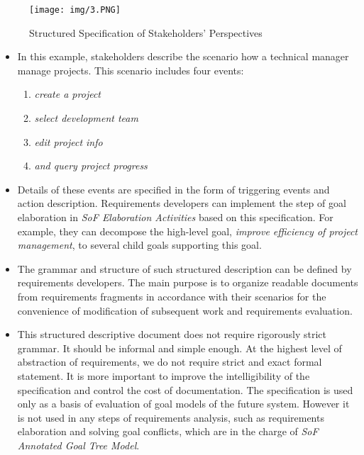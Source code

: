 ﻿\documentclass{beamer}
\begin{document}
\begin{frame}          %
  \begin{figure}
    \texttt{[image: img/3.PNG]}
    \caption{Structured Specification of Stakeholders' Perspectives}
  \end{figure}
\end{frame}

\begin{frame}     %
  \footnotesize{
    \begin{itemize}
    \item
      In this example, stakeholders describe the scenario how a technical manager manage projects.
      This scenario includes four events:
      \begin{enumerate}
      \item \emph{create a project}
      \item \emph{select development team}
      \item \emph{edit project info}
      \item \emph{and query project progress}
      \end{enumerate}
    \item 
      Details of these events are specified in the form of triggering events and action description.
      Requirements developers can implement the step of goal elaboration in \emph{SoF Elaboration Activities} based on this specification.
      For example, they can decompose the high-level goal, \emph{improve efficiency of project management}, to several child goals supporting this goal.\pause
    \end{itemize}
  }
\end{frame}
\begin{frame}     %
  \footnotesize{
    \begin{itemize}
    \item 
      The grammar and structure of such structured description can be defined by requirements developers. The main purpose is to organize readable documents from requirements fragments in accordance with their scenarios for the convenience of modification of subsequent work and requirements evaluation.\pause
    \item
      This structured descriptive document does not require rigorously strict grammar.
      It should be informal and simple enough.
      At the highest level of abstraction of requirements, we do not require strict and exact formal statement.
      It is more important to improve the intelligibility of the specification and control the cost of documentation.
      The specification is used only as a basis of evaluation of goal models of the future system.
      However it is not used in any steps of requirements analysis, such as requirements elaboration and solving goal conflicts, which are in the charge of \emph{SoF Annotated Goal Tree Model}.\pause
    \end{itemize}
  }
\end{frame}
\end{document}
